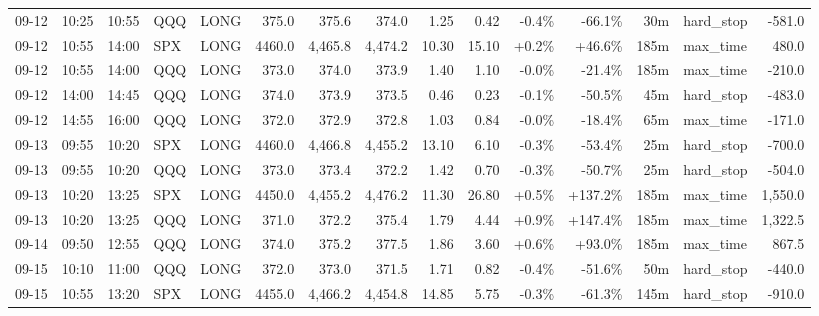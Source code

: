 \documentclass[11pt,a4paper,twoside]{article}
\begin{document}
\begin{landscape}
\begin{center}
\begin{longtable}{>{\color{txtmain}}l l l l l r r r r r r r r >{\color{txtmain}}l r}
09-12 & 10:25 & 10:55 & QQQ & LONG & 375.0 & 375.6 & 374.0 & 1.25 & 0.42 & \textcolor{lossred}{-0.4\%} & \textcolor{lossred}{-66.1\%} & 30m & hard\_stop & \textcolor{lossred}{-581.0} \\
09-12 & 10:55 & 14:00 & SPX & LONG & 4460.0 & 4,465.8 & 4,474.2 & 10.30 & 15.10 & \textcolor{wingreen}{+0.2\%} & \textcolor{wingreen}{+46.6\%} & 185m & max\_time & \textcolor{wingreen}{480.0} \\
09-12 & 10:55 & 14:00 & QQQ & LONG & 373.0 & 374.0 & 373.9 & 1.40 & 1.10 & \textcolor{lossred}{-0.0\%} & \textcolor{lossred}{-21.4\%} & 185m & max\_time & \textcolor{lossred}{-210.0} \\
09-12 & 14:00 & 14:45 & QQQ & LONG & 374.0 & 373.9 & 373.5 & 0.46 & 0.23 & \textcolor{lossred}{-0.1\%} & \textcolor{lossred}{-50.5\%} & 45m & hard\_stop & \textcolor{lossred}{-483.0} \\
09-12 & 14:55 & 16:00 & QQQ & LONG & 372.0 & 372.9 & 372.8 & 1.03 & 0.84 & \textcolor{lossred}{-0.0\%} & \textcolor{lossred}{-18.4\%} & 65m & max\_time & \textcolor{lossred}{-171.0} \\
09-13 & 09:55 & 10:20 & SPX & LONG & 4460.0 & 4,466.8 & 4,455.2 & 13.10 & 6.10 & \textcolor{lossred}{-0.3\%} & \textcolor{lossred}{-53.4\%} & 25m & hard\_stop & \textcolor{lossred}{-700.0} \\
09-13 & 09:55 & 10:20 & QQQ & LONG & 373.0 & 373.4 & 372.2 & 1.42 & 0.70 & \textcolor{lossred}{-0.3\%} & \textcolor{lossred}{-50.7\%} & 25m & hard\_stop & \textcolor{lossred}{-504.0} \\
09-13 & 10:20 & 13:25 & SPX & LONG & 4450.0 & 4,455.2 & 4,476.2 & 11.30 & 26.80 & \textcolor{wingreen}{+0.5\%} & \textcolor{wingreen}{+137.2\%} & 185m & max\_time & \textcolor{wingreen}{1,550.0} \\
09-13 & 10:20 & 13:25 & QQQ & LONG & 371.0 & 372.2 & 375.4 & 1.79 & 4.44 & \textcolor{wingreen}{+0.9\%} & \textcolor{wingreen}{+147.4\%} & 185m & max\_time & \textcolor{wingreen}{1,322.5} \\
09-14 & 09:50 & 12:55 & QQQ & LONG & 374.0 & 375.2 & 377.5 & 1.86 & 3.60 & \textcolor{wingreen}{+0.6\%} & \textcolor{wingreen}{+93.0\%} & 185m & max\_time & \textcolor{wingreen}{867.5} \\
09-15 & 10:10 & 11:00 & QQQ & LONG & 372.0 & 373.0 & 371.5 & 1.71 & 0.82 & \textcolor{lossred}{-0.4\%} & \textcolor{lossred}{-51.6\%} & 50m & hard\_stop & \textcolor{lossred}{-440.0} \\
09-15 & 10:55 & 13:20 & SPX & LONG & 4455.0 & 4,466.2 & 4,454.8 & 14.85 & 5.75 & \textcolor{lossred}{-0.3\%} & \textcolor{lossred}{-61.3\%} & 145m & hard\_stop & \textcolor{lossred}{-910.0} \\

\end{longtable}
\end{center}
\end{landscape}
\end{document}
